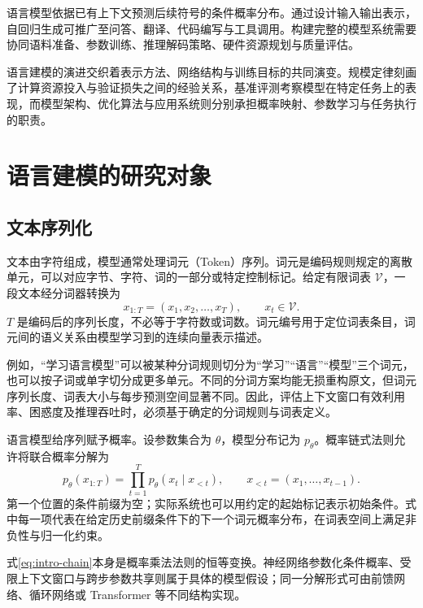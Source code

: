 \documentclass[../textbook.tex]{subfiles}
\begin{document}
\fi
{}

语言模型依据已有上下文预测后续符号的条件概率分布。通过设计输入输出表示，自回归生成可推广至问答、翻译、代码编写与工具调用。构建完整的模型系统需要协同语料准备、参数训练、推理解码策略、硬件资源规划与质量评估。

语言建模的演进交织着表示方法、网络结构与训练目标的共同演变。规模定律刻画了计算资源投入与验证损失之间的经验关系，基准评测考察模型在特定任务上的表现，而模型架构、优化算法与应用系统则分别承担概率映射、参数学习与任务执行的职责。

\section{语言建模的研究对象}

\subsection{文本序列化}
文本由字符组成，模型通常处理词元（Token）序列。词元是编码规则规定的离散单元，可以对应字节、字符、词的一部分或特定控制标记。给定有限词表 $\mathcal V$，一段文本经分词器转换为
\begin{equation}
 x_{1:T}=(x_1,x_2,\ldots,x_T),\qquad x_t\in\mathcal V.
\end{equation}
$T$ 是编码后的序列长度，不必等于字符数或词数。词元编号用于定位词表条目，词元间的语义关系由模型学习到的连续向量表示描述。

例如，“学习语言模型”可以被某种分词规则切分为“学习”“语言”“模型”三个词元，也可以按子词或单字切分成更多单元。不同的分词方案均能无损重构原文，但词元序列长度、词表大小与每步预测空间显著不同。因此，评估上下文窗口有效利用率、困惑度及推理吞吐时，必须基于确定的分词规则与词表定义。

语言模型给序列赋予概率。设参数集合为 $\theta$，模型分布记为 $p_\theta$。概率链式法则允许将联合概率分解为
\begin{equation}\label{eq:intro-chain}
 p_\theta(x_{1:T})=\prod_{t=1}^{T}p_\theta(x_t\mid x_{<t}),
 \qquad x_{<t}=(x_1,\ldots,x_{t-1}).
\end{equation}
第一个位置的条件前缀为空；实际系统也可以用约定的起始标记表示初始条件。式中每一项代表在给定历史前缀条件下的下一个词元概率分布，在词表空间上满足非负性与归一化约束。

式\eqref{eq:intro-chain}本身是概率乘法法则的恒等变换。神经网络参数化条件概率、受限上下文窗口与跨步参数共享则属于具体的模型假设；同一分解形式可由前馈网络、循环网络或 Transformer 等不同结构实现。
\end{document}
